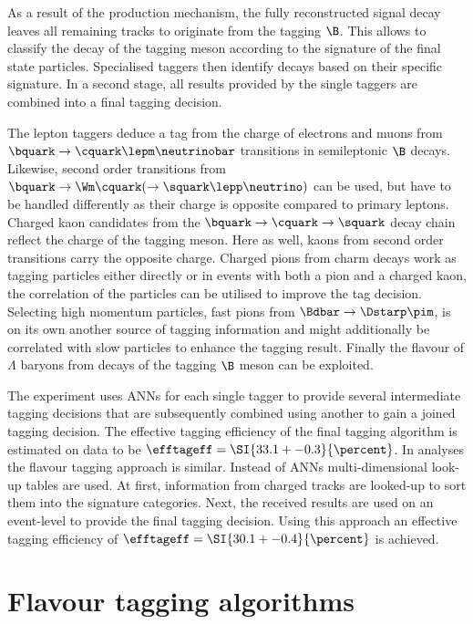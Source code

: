 As a result of the production mechanism, the fully reconstructed signal decay
leaves all remaining tracks to originate from the tagging $\B$. This allows to
classify the decay of the tagging meson according to the signature of the final
state particles. Specialised taggers then identify decays based on their
specific signature. In a second stage, all results provided by the single
taggers are combined into a final tagging decision. 

The lepton taggers deduce a tag from the charge of electrons and muons from
$\bquark \to \cquark \lepm \neutrinobar$ transitions in semileptonic $\B$
decays. Likewise, second order transitions from $\bquark \to \Wm \cquark ( \to
\squark \lepp \neutrino )$ can be used, but have to be handled differently as
their charge is opposite compared to primary leptons. Charged kaon candidates
from the $\bquark \to \cquark \to \squark$ decay chain reflect the charge of the
tagging meson. Here as well, kaons from second order transitions carry the
opposite charge. Charged pions from charm decays work as tagging particles
either directly or in events with both a pion and a charged kaon, the
correlation of the particles can be utilised to improve the tag decision.
Selecting high momentum particles, \eg fast pions from $\Bdbar \to \Dstarp
\pim$, is on its own another source of tagging information and might
additionally be correlated with slow particles to enhance the tagging result.
Finally the flavour of $\Lambda$ baryons from decays of the tagging $\B$ meson
can be exploited.

The \Babar experiment uses \acp{ANN} for each single tagger to provide several
intermediate tagging decisions that are subsequently combined using another \ANN
to gain a joined tagging decision. The effective tagging efficiency of the final
\Babar tagging algorithm is estimated on data to be $\efftageff = \SI{33.1 +-
0.3}{\percent}$. In \Belle analyses the flavour tagging approach is similar.
Instead of \acp{ANN} multi-dimensional look-up tables are used. At first,
information from charged tracks are looked-up to sort them into the signature
categories. Next, the received results are used on an event-level to provide the
final tagging decision. Using this approach an effective tagging efficiency of
$\efftageff = \SI{30.1 +- 0.4}{\percent}$ is achieved.

\section{Flavour tagging algorithms}
\label{sec:flavour_tagging:lhcb}

